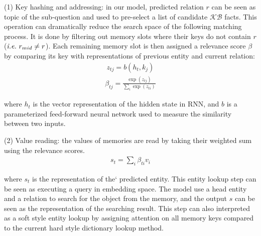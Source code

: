 (1) Key hashing and addressing: in our model, predicted relation $r$ can be seen as topic of the sub-question and used to pre-select a list of candidate $\mathcal{KB}$ facts. This operation can dramatically reduce the search space of the following matching process. It is done by filtering out memory slots where their keys do not contain $r$ ($\emph{i.e.}\ r_{mid}\neq r$). Each remaining memory slot is then assigned a relevance score $\beta$ by comparing its key with representations of previous entity and current relation: %
\begin{align}
z_{tj} = b(h_t, k_j)
\end{align}
\vspace{-3ex}
\begin{align}
\beta_{tj} = \frac{\exp (z_{tj})}{\sum_i\exp (z_{ti})}
\end{align}

where $h_t$ is the vector representation of the hidden state in RNN, and $b$ is a parameterized feed-forward neural network used to measure the similarity between two inputs. 

(2) Value reading: the values of memories are read by taking their weighted sum using the relevance scores.
\begin{align}
s_t =\sum_{i}\beta_{ti}v_i
\end{align}

where $s_t$ is the representation of the` predicted entity. This entity lookup step can be seen as executing a query in embedding space. The model use a head entity and a relation to search for the object from the memory, and the output $s$ can be seen as the representation of the searching result. This step can also interpreted as a soft style entity lookup by assigning attention on all memory keys compared to the current hard style dictionary lookup method.